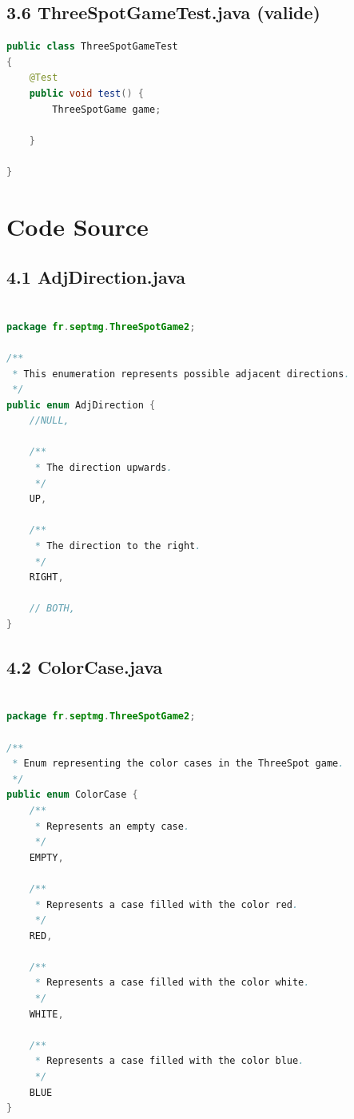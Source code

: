\documentclass[a4paper,11pt]{article}
\begin{document}
\newpage
\subsection{3.6 ThreeSpotGameTest.java (valide)}

\begin{lstlisting}[language=Java]
public class ThreeSpotGameTest 
{
    @Test
    public void test() {
        ThreeSpotGame game;

    }

}

\end{lstlisting}
\newpage

\section{Code Source}

\subsection{4.1 AdjDirection.java}

\begin{lstlisting}[language=Java]

package fr.septmg.ThreeSpotGame2;

/**
 * This enumeration represents possible adjacent directions.
 */
public enum AdjDirection {
    //NULL,
    
    /**
     * The direction upwards.
     */
    UP,

    /**
     * The direction to the right.
     */
    RIGHT,
    
    // BOTH,
}

\end{lstlisting}
\newpage

\subsection{4.2 ColorCase.java}

\begin{lstlisting}[language=Java]

package fr.septmg.ThreeSpotGame2;

/**
 * Enum representing the color cases in the ThreeSpot game.
 */
public enum ColorCase {
    /**
     * Represents an empty case.
     */
    EMPTY,

    /**
     * Represents a case filled with the color red.
     */
    RED,

    /**
     * Represents a case filled with the color white.
     */
    WHITE,

    /**
     * Represents a case filled with the color blue.
     */
    BLUE
}


\end{lstlisting}
\newpage
\end{document}
